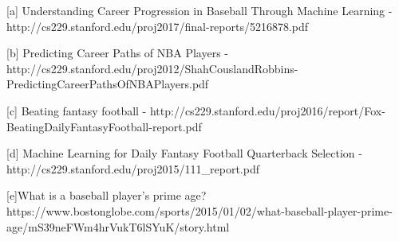 \documentclass{article}
\begin{document}
\begin{sloppypar}
\begin{flushleft}

[a] Understanding Career Progression in Baseball Through Machine Learning - http://cs229.stanford.edu/proj2017/final-reports/5216878.pdf

[b] Predicting Career Paths of NBA Players - http://cs229.stanford.edu/proj2012/ShahCouslandRobbins-PredictingCareerPathsOfNBAPlayers.pdf

[c] Beating fantasy football - http://cs229.stanford.edu/proj2016/report/Fox-BeatingDailyFantasyFootball-report.pdf

[d] Machine Learning for Daily Fantasy Football Quarterback Selection - http://cs229.stanford.edu/proj2015/111\_report.pdf

[e]What is a baseball player's prime age?
https://www.bostonglobe.com/sports/2015/01/02/what-baseball-player-prime-age/mS39neFWm4hrVukT6lSYuK/story.html
\end{flushleft}

\end{sloppypar}
\end{document}
